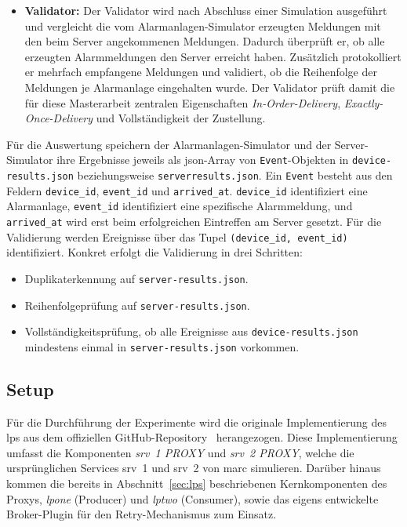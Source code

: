 \begin{itemize}
    \item \textbf{Validator:} Der Validator wird nach Abschluss einer Simulation ausgeführt und vergleicht die vom Alarmanlagen-Simulator erzeugten Meldungen mit den beim Server angekommenen Meldungen. Dadurch über\-prüft er, ob alle erzeugten Alarmmeldungen den Server erreicht haben. Zusätzlich protokolliert er mehrfach empfangene Meldungen und validiert, ob die Reihenfolge der Meldungen je Alarmanlage eingehalten wurde. Der Validator prüft damit die für diese Masterarbeit zentralen Eigenschaften \textit{In-Order-Delivery}, \textit{Exactly-Once-Delivery} und Vollständigkeit der Zustellung.
\end{itemize}

Für die Auswertung speichern der Alarmanlagen-Simulator und der Server-Simulator ihre Ergebnisse jeweils als \gls{json}-Array von \texttt{Event}-Objekten in \texttt{device-results.json} beziehungsweise \texttt{server\-results.json}. Ein \texttt{Event} besteht aus den Feldern \texttt{device\_id}, \texttt{event\_id} und \texttt{arrived\_at}. \texttt{device\_id} identifiziert eine Alarmanlage, \texttt{event\_id} identifiziert eine spezifische Alarmmeldung, und \texttt{arrived\_at} wird erst beim erfolgreichen Eintreffen am Server gesetzt. Für die Validierung werden Ereignisse über das Tupel \texttt{(device\_id, event\_id)} identifiziert. Konkret erfolgt die Validierung in drei Schritten:

\begin{itemize}
    \item Duplikaterkennung auf \texttt{server-results.json}.
    \item Reihenfolgeprüfung auf \texttt{server-results.json}.
    \item Vollständigkeitsprüfung, ob alle Ereignisse aus \texttt{device-results.json} mindestens einmal in \texttt{server-results.json} vorkommen.
\end{itemize}

\subsection{Setup}
\label{sub-sec:setup}

Für die Durchführung der Experimente wird die originale Implementierung des \gls{lps} aus dem offiziellen GitHub-Repository~\citep{legacy_proxy_pattern_repo} herangezogen. Diese Implementierung umfasst die Komponenten \textit{\gls{srv}~1 PROXY} und \textit{\gls{srv}~2 PROXY}, welche die ursprünglichen Services \gls{srv}~1 und \gls{srv}~2 von \gls{marc} simulieren. Darüber hinaus kommen die bereits in Abschnitt~\ref{sec:lps} beschriebenen Kernkomponenten des Proxys, \textit{\gls{lpone}} (Producer) und \textit{\gls{lptwo}} (Consumer), sowie das eigens entwickelte Broker-Plugin für den Retry-Mechanismus zum Einsatz.

